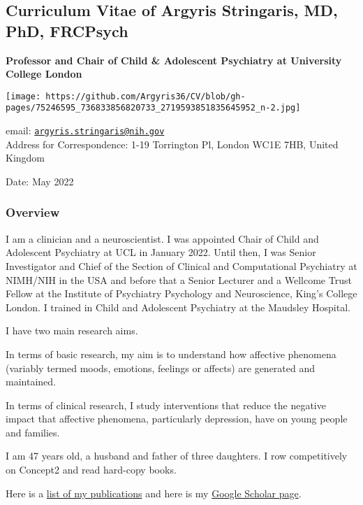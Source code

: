 \documentclass[
]{article}
\author{}
\date{\vspace{-2.5em}}
\begin{document}
\hypertarget{curriculum-vitae-of-argyris-stringaris-md-phd-frcpsych}{%
\subsection{Curriculum Vitae of Argyris Stringaris, MD, PhD,
FRCPsych}\label{curriculum-vitae-of-argyris-stringaris-md-phd-frcpsych}}

\textbf{Professor and Chair of Child \& Adolescent Psychiatry at
University College London}

\texttt{[image: https://github.com/Argyris36/CV/blob/gh-pages/75246595\_736833856820733\_2719593851835645952\_n-2.jpg]}

email:
\href{mailto:argyris.stringaris@nih.gov}{\nolinkurl{argyris.stringaris@nih.gov}}\\
Address for Correspondence: 1-19 Torrington Pl, London WC1E 7HB, United
Kingdom

Date: May 2022

\hypertarget{overview}{%
\subsubsection{Overview}\label{overview}}

I am a clinician and a neuroscientist. I was appointed Chair of Child
and Adolescent Psychiatry at UCL in January 2022. Until then, I was
Senior Investigator and Chief of the Section of Clinical and
Computational Psychiatry at NIMH/NIH in the USA and before that a Senior
Lecturer and a Wellcome Trust Fellow at the Institute of Psychiatry
Psychology and Neuroscience, King's College London. I trained in Child
and Adolescent Psychiatry at the Maudsley Hospital.

I have two main research aims.

In terms of basic research, my aim is to understand how affective
phenomena (variably termed moods, emotions, feelings or affects) are
generated and maintained.

In terms of clinical research, I study interventions that reduce the
negative impact that affective phenomena, particularly depression, have
on young people and families.

I am 47 years old, a husband and father of three daughters. I row
competitively on Concept2 and read hard-copy books.

Here is a
\href{https://pubmed.ncbi.nlm.nih.gov/?term=stringaris+a\&sort=date}{list
of my publications} and here is my
\href{https://scholar.google.com/citations?user=9B82424AAAAJ\&hl=en\&oi=ao}{Google
Scholar page}.
\end{document}
